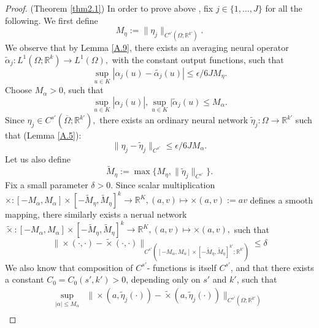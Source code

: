 \documentclass[reqno]{amsart}
\theoremstyle{plain}
\theoremstyle{definition}
\newcommand{\bb}[1]{\mathbb{#1}}
\begin{document}
\begin{proof}{(Theorem \ref{thm2.1})}
    \noindent In order to prove above , fix $j \in \{1,\dots, J\}$ for all the following. We first define
    \begin{equation}
        M_\eta := \|\eta_j\|_{C^{s'}(\Omega;\bb R^{k'})}.
    \end{equation}
    We observe that by Lemma \ref{A.9}, there exists an averaging neural operator $\tilde{\alpha}_j : L^1(\Omega;\bb R^k) \to L^1(\Omega),$ with the constant output functions, such that
    \begin{equation}\label{eq15}
        \sup_{u \in K}|\alpha_j(u) - \tilde{\alpha_j}(u)| \leq \epsilon/6JM_\eta.
    \end{equation}
    Choose $M_\alpha > 0$, such that
    \begin{equation}
        \sup_{u \in K}|\alpha_j(u)|, \sup_{u\in K}|\tilde{\alpha}_j(u) \leq M_\alpha.
    \end{equation}
    Since $\eta_j\in C^{s'}(\overline{\Omega};\bb R^{k'}),$ there exists an ordinary neural network $\tilde{\eta}_j: \Omega \to \bb R^{k'}$ such that (Lemma \ref{A.5}):
    \begin{equation} \label{eq17}
        \|\eta_j - \tilde{\eta}_j\|_{C^{s'}} \leq \epsilon/6JM_\alpha.
    \end{equation}
    Let us also define 
    \begin{equation}
        \tilde{M}_\eta := \max\{M_\eta,\|\tilde{\eta}_j\|_{C^{s'}}\}.
    \end{equation}
    Fix a small parameter $\delta > 0$. Since scalar multiplication $\times : [-M_\alpha,M_\alpha] \times [-\tilde{M}_\eta, \tilde{M}_\eta]^k \to \bb R^K, (a,v) \mapsto \times(a,v) := av$ defines a smooth mapping, there similarly exists a nerual network $\tilde{\times} : [-M_\alpha,M_\alpha] \times [-\tilde{M}_\eta, \tilde{M}_\eta]^k \to \bb R^K, (a,v) \mapsto \times(a,v),$ such that
    \begin{equation}\label{eq19}
        \|\times(\cdot,\cdot) - \tilde{\times}(\cdot,\cdot)\|_{C^{s'}([-M_\alpha,M_\alpha] \times [-\tilde{M}_\eta, \tilde{M}_\eta]^{k'};\bb R^{k'})} \leq \delta
    \end{equation}
    We also know that composition of $C^{s'}$- functions is itself $C^{s'}$, and that there exists a constant $C_0 = C_0(s',k') > 0$, depending only on $s'$ and $k'$, such that
    $$
    \begin{aligned}
        \sup_{|\alpha| \leq M_\alpha} &\|\times (a,\tilde{\eta}_j(\cdot)) - \tilde{\times}(a,\tilde{\eta}_j(\cdot))\|_{C^{s'}(\Omega;\bb R^{k'})}\\

\end{aligned}$$
\end{proof}
\end{document}
